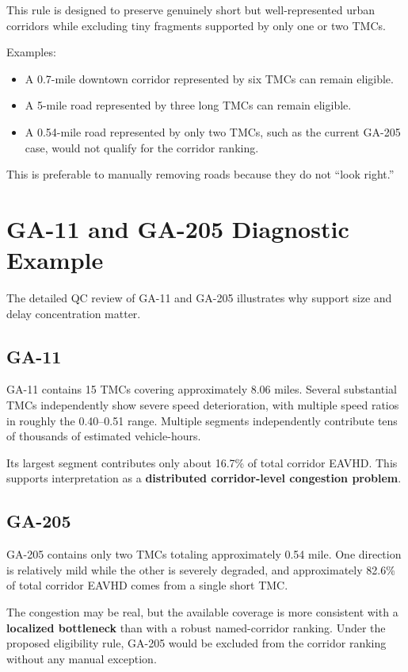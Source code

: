 \documentclass[11pt]{article}
\begin{document}
This rule is designed to preserve genuinely short but well-represented urban corridors while excluding tiny fragments supported by only one or two TMCs.

Examples:

\begin{itemize}
    \item A 0.7-mile downtown corridor represented by six TMCs can remain eligible.
    \item A 5-mile road represented by three long TMCs can remain eligible.
    \item A 0.54-mile road represented by only two TMCs, such as the current GA-205 case, would not qualify for the corridor ranking.
\end{itemize}

This is preferable to manually removing roads because they do not ``look right.''

\section{GA-11 and GA-205 Diagnostic Example}

The detailed QC review of GA-11 and GA-205 illustrates why support size and delay concentration matter.

\subsection{GA-11}

GA-11 contains 15 TMCs covering approximately 8.06 miles. Several substantial TMCs independently show severe speed deterioration, with multiple speed ratios in roughly the 0.40--0.51 range. Multiple segments independently contribute tens of thousands of estimated vehicle-hours.

Its largest segment contributes only about 16.7\% of total corridor EAVHD. This supports interpretation as a \textbf{distributed corridor-level congestion problem}.

\subsection{GA-205}

GA-205 contains only two TMCs totaling approximately 0.54 mile. One direction is relatively mild while the other is severely degraded, and approximately 82.6\% of total corridor EAVHD comes from a single short TMC.

The congestion may be real, but the available coverage is more consistent with a \textbf{localized bottleneck} than with a robust named-corridor ranking. Under the proposed eligibility rule, GA-205 would be excluded from the corridor ranking without any manual exception.
\end{document}
